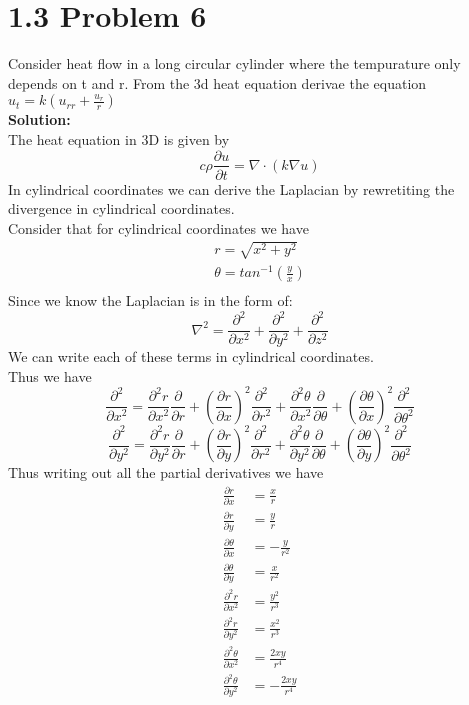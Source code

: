 \documentclass{article}
\begin{document}
\section*{1.3 Problem 6}
Consider heat flow in a long circular cylinder where the tempurature only depends on t and r. From the 3d heat equation derivae the equation $u_t = k(u_{rr} + \frac{u_r}{r})$\\
\textbf{Solution:}\\
The heat equation in 3D is given by\\
$$c \rho \frac{\partial u}{\partial t} = \nabla \cdot (k \nabla u)$$
In cylindrical coordinates we can derive the Laplacian by rewretiting the divergence in cylindrical coordinates.\\
Consider that for cylindrical coordinates we have\\
\begin{align*}
    r = \sqrt{x^2 + y^2}\\
    \theta = tan^{-1}(\frac{y}{x})\\
\end{align*} 
Since we know the Laplacian is in the form of:\\
$$\nabla^2 = \frac{\partial^2}{\partial x^2} + \frac{\partial^2}{\partial y^2}  + \frac{\partial^2}{\partial z^2}$$
We can write each of these terms in cylindrical coordinates.\\
Thus we have\\
$$\frac{\partial^2}{\partial x^2} = \frac{\partial^2 r}{\partial x^2}\frac{\partial}{\partial r} + (\frac{\partial r}{\partial x})^2\frac{\partial^2}{\partial r^2} + \frac{\partial^2 \theta}{\partial x^2}\frac{\partial}{\partial \theta} + (\frac{\partial \theta}{\partial x})^2\frac{\partial^2}{\partial \theta^2} $$
$$ \frac{\partial^2}{\partial y^2} = \frac{\partial^2 r}{\partial y^2}\frac{\partial}{\partial r} + (\frac{\partial r}{\partial y})^2\frac{\partial^2}{\partial r^2} + \frac{\partial^2 \theta}{\partial y^2}\frac{\partial}{\partial \theta} + (\frac{\partial \theta}{\partial y})^2\frac{\partial^2}{\partial \theta^2} $$
Thus writing out all the partial derivatives we have\\
\begin{align*}
    \frac{\partial r}{\partial x} &= \frac{x}{r}\\
    \frac{\partial r}{\partial y} &= \frac{y}{r}\\
    \frac{\partial \theta}{\partial x} &= -\frac{y}{r^2}\\
    \frac{\partial \theta}{\partial y} &= \frac{x}{r^2}\\
    \frac{\partial^2 r}{\partial x^2} &= \frac{y^2}{r^3}\\
    \frac{\partial^2 r}{\partial y^2} &= \frac{x^2}{r^3} \\
    \frac{\partial^2 \theta}{\partial x^2} &= \frac{2xy}{r^4}\\
    \frac{\partial^2 \theta}{\partial y^2} &= -\frac{2xy}{r^4}
\end{align*}
\end{document}
